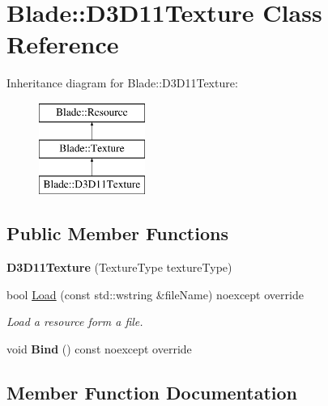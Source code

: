 \hypertarget{class_blade_1_1_d3_d11_texture}{}\section{Blade\+:\+:D3\+D11\+Texture Class Reference}
\label{class_blade_1_1_d3_d11_texture}
Inheritance diagram for Blade\+:\+:D3\+D11\+Texture\+:\begin{figure}[H]
\begin{center}
\leavevmode
\includegraphics[height=3.000000cm]{class_blade_1_1_d3_d11_texture}
\end{center}
\end{figure}
\subsection*{Public Member Functions}
\begin{DoxyCompactItemize}
\item 
\mbox{\label{class_blade_1_1_d3_d11_texture_ac8222f74d203b5780d6d17913d9397a7}} 
{\bfseries D3\+D11\+Texture} (Texture\+Type texture\+Type)
\item 
bool \hyperlink{class_blade_1_1_d3_d11_texture_ae9f6d01709ba9db4085cf6b3d90b3ac7}{Load} (const std\+::wstring \&file\+Name) noexcept override
\begin{DoxyCompactList}\small\item\em Load a resource form a file. \end{DoxyCompactList}\item 
\mbox{\label{class_blade_1_1_d3_d11_texture_a1e0366d9294d0435d60076b6f9291c6c}} 
void {\bfseries Bind} () const noexcept override
\end{DoxyCompactItemize}


\subsection{Member Function Documentation}
\mbox{\label{class_blade_1_1_d3_d11_texture_ae9f6d01709ba9db4085cf6b3d90b3ac7}} 
